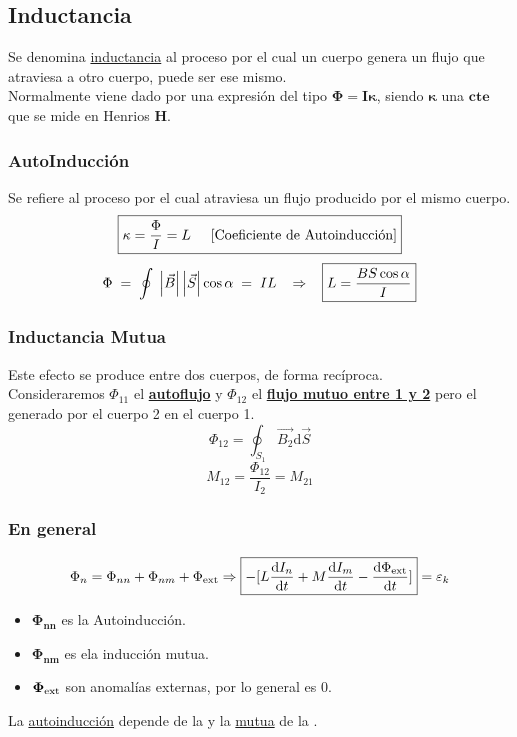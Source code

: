 \subsection{Inductancia}
 Se denomina \underline{inductancia} al proceso por el cual un cuerpo genera un flujo que atraviesa a otro cuerpo, puede ser ese mismo.\\
Normalmente viene dado por una expresión del tipo \(\mathbf{\Phi = I \kappa}\), siendo \(\mathbf{\kappa}\) una \(\mathbf{cte}\) que se mide en Henrios \textbf{H}.
\subsubsection{AutoInducción}
 Se refiere al proceso por el cual atraviesa un flujo producido por el mismo cuerpo.
\[
        \boxed{\kappa = \frac{\Phi}{I} = L \hspace{5mm} \textnormal{[Coeficiente de Autoinducción]}}
\]
\[
        \Phi \hspace{1mm}=\hspace{1mm} \oint \hspace{1mm}\left | \vec{B} \right |\left |\vec{S} \right | \cos{\alpha}\hspace{1mm} = \hspace{1mm}IL \hspace{3mm}\Rightarrow \hspace{3mm} \boxed{L = \frac{BS\cos{\alpha}}{I}}
\]
\subsubsection{Inductancia Mutua}
 Este efecto se produce entre dos cuerpos, de forma recíproca.\\
Consideraremos \(\Phi_{11}\) el \underline{\textbf{autoflujo}} y \(\Phi_{12}\) el \underline{\textbf{flujo mutuo entre 1 y 2}} pero el generado por el cuerpo 2 en el cuerpo 1.
\[
        \Phi_{12} = \oint_{S_1} \vec{B_2}\mathrm{d}\vec{S}
\]
\[
        \boxed{M_{12} = \frac{\Phi_{12}}{I_2} = M_{21}}
\]
\subsubsection{En general}
\[
        \Phi_n = \Phi_{nn} + \Phi_{nm} +\Phi_{\textnormal{ext}}
        \Rightarrow
        \boxed{-[L \frac{\mathrm{d}I_n}{\mathrm{d}t}+M\frac{\mathrm{d}I_m}{\mathrm{d}t} - \frac{\mathrm{d}\Phi_{\textnormal{ext}}}{\mathrm{d}t}]} = \varepsilon_k
\]
\begin{itemize}
        \item \(\mathbf{\Phi_{nn}}\) es la Autoinducción.
              \item\(\mathbf{\Phi_{nm}}\) es ela inducción mutua.
              \item\(\mathbf{\Phi_{\textnormal{ext}}}\) son anomalías externas, por lo general es 0.
\end{itemize}
 La \underline{autoinducción} depende de la  y la \underline{mutua} de la .
